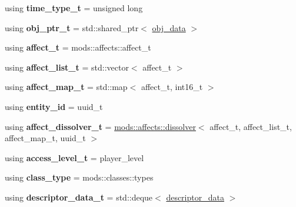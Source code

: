 \begin{DoxyCompactItemize}
using {\bfseries time\+\_\+type\+\_\+t} = unsigned long
\item 
\mbox{\label{classmods_1_1player_a40c493bab50426d4a75ae75a71a80415}} 
using {\bfseries obj\+\_\+ptr\+\_\+t} = std\+::shared\+\_\+ptr$<$ \hyperlink{structobj__data}{obj\+\_\+data} $>$
\item 
\mbox{\label{classmods_1_1player_ad91019467602d6eb067746a224b6b34a}} 
using {\bfseries affect\+\_\+t} = mods\+::affects\+::affect\+\_\+t
\item 
\mbox{\label{classmods_1_1player_a1c4e7ba00b0943a826d3706581913ed3}} 
using {\bfseries affect\+\_\+list\+\_\+t} = std\+::vector$<$ affect\+\_\+t $>$
\item 
\mbox{\label{classmods_1_1player_ab8fb8409c326418ad130d44a163a2672}} 
using {\bfseries affect\+\_\+map\+\_\+t} = std\+::map$<$ affect\+\_\+t, int16\+\_\+t $>$
\item 
\mbox{\label{classmods_1_1player_afcd148c80d58e381ba53d0cadcac7d19}} 
using {\bfseries entity\+\_\+id} = uuid\+\_\+t
\item 
\mbox{\label{classmods_1_1player_adde126941025019ac7e259a05400e9c1}} 
using {\bfseries affect\+\_\+dissolver\+\_\+t} = \hyperlink{structmods_1_1affects_1_1dissolver}{mods\+::affects\+::dissolver}$<$ affect\+\_\+t, affect\+\_\+list\+\_\+t, affect\+\_\+map\+\_\+t, uuid\+\_\+t $>$
\item 
\mbox{\label{classmods_1_1player_a584c6eae4eed191082f507d4f1d49fd6}} 
using {\bfseries access\+\_\+level\+\_\+t} = player\+\_\+level
\item 
\mbox{\label{classmods_1_1player_a20acafc81d8553756c3b140d992c528d}} 
using {\bfseries class\+\_\+type} = mods\+::classes\+::types
\item 
\mbox{\label{classmods_1_1player_a82c7005a1c9552f9bd13fcc6db5bf745}} 
using {\bfseries descriptor\+\_\+data\+\_\+t} = std\+::deque$<$ \hyperlink{structmods_1_1descriptor__data}{descriptor\+\_\+data} $>$
\item 

\end{DoxyCompactItemize}
